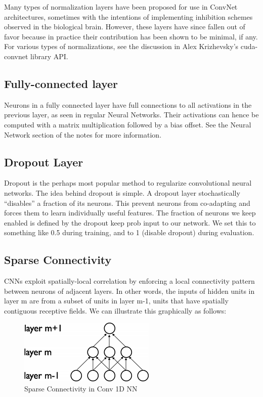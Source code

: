 \documentclass{article}
\begin{document}
\quad Many types of normalization layers have been proposed for use in ConvNet architectures, sometimes with the intentions of implementing inhibition schemes observed in the biological brain. However, these layers have since fallen out of favor because in practice their contribution has been shown to be minimal, if any. For various types of normalizations, see the discussion in Alex Krizhevsky’s cuda-convnet library API.

\subsection{Fully-connected layer}

\quad Neurons in a fully connected layer have full connections to all activations in the previous layer, as seen in regular Neural Networks. Their activations can hence be computed with a matrix multiplication followed by a bias offset. See the Neural Network section of the notes for more information.

\subsection{Dropout Layer}
\quad Dropout is the perhaps most popular method to regularize convolutional neural networks. The idea behind dropout is simple. A dropout layer stochastically “disables” a fraction of its neurons. This prevent neurons from co-adapting and forces them to learn individually useful features. The fraction of neurons we keep enabled is defined by the dropout keep prob input to our network. We set this to something like 0.5 during training, and to 1 (disable dropout) during evaluation.

\subsection{Sparse Connectivity}
\quad CNNs exploit spatially-local correlation by enforcing a local connectivity pattern between neurons of adjacent layers. In other words, the inputs of hidden units in layer m are from a subset of units in layer m-1, units that have spatially contiguous receptive fields. We can illustrate this graphically as follows:


\begin{figure}[H]
\centering
\includegraphics[width=.2\textwidth]{sparse_1D_nn.png}
\caption{Sparse Connectivity in Conv 1D NN}
\end{figure}
\end{document}
